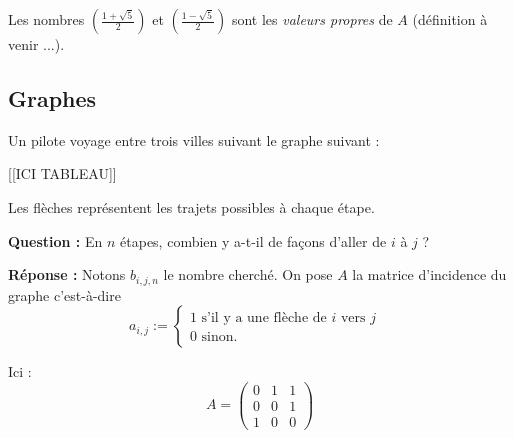 \documentclass[class=report,crop=false]{standalone}
\begin{document}
\begin{remarque*}
Les nombres $(\frac{1+ \sqrt{5}}{2})$ et $(\frac{1- \sqrt{5}}{2})$ sont les {\it valeurs propres} de $A$ (définition à venir ...).
\end{remarque*}

\subsection{Graphes}

Un pilote voyage entre trois villes suivant le graphe suivant :


[[ICI TABLEAU]]



Les flèches représentent les trajets possibles à chaque étape.

{\bf Question : } En $n$ étapes, combien y a-t-il de fa\c{c}ons d'aller de $i$ à $j$ ? 

{\bf Réponse : } Notons $b_{i,j,n}$ le nombre cherché. On pose $A$ la matrice d'incidence du graphe c'est-à-dire \[a_{i,j} := \left\{ \begin{array}{l}
1 \mbox{ s'il y a une flèche de $i$ vers $j$ }\\
0 \mbox{ sinon.}
\end{array}\right.\]

Ici : \[A = \left( \begin{array}{ccc}
0&1&1\\
0 &0&1\\
1 &0 &0
\end{array}
\right)\]
\end{document}
